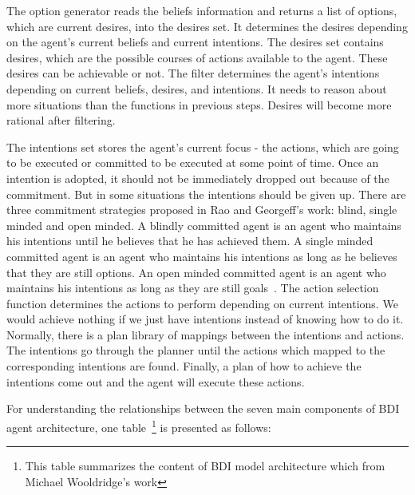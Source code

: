 The option generator reads the beliefs information and returns a list of options, which are current desires, into the desires set.
It determines the desires depending on the agent's current beliefs and current intentions.
The desires set contains desires, which are the possible courses of actions available to the agent.
These desires can be achievable or not.
The filter determines the agent's intentions depending on current beliefs, desires, and intentions.
It needs to reason about more situations than the functions in previous steps.
Desires will become more rational after filtering.

The intentions set stores the agent's current focus - the actions, which are going to be executed or committed to be executed at some point of time.
Once an intention is adopted, it should not be immediately dropped out because of the commitment.
But in some situations the intentions should be given up.
There are three commitment strategies proposed in Rao and Georgeff's work: blind, single minded and open minded.
A blindly committed agent is an agent who maintains his intentions until he believes that he has achieved them.
A single minded committed agent is an agent who maintains his intentions as long as he believes that they are still options.
An open minded committed agent is an agent who maintains his intentions as long as they are still goals~\cite{Roberto_BDIATL_2005}.
The action selection function determines the actions to perform depending on current intentions.
We would achieve nothing if we just have intentions instead of knowing how to do it.
Normally, there is a plan library of mappings between the intentions and actions.
The intentions go through the planner until the actions which mapped to the corresponding intentions are found.
Finally, a plan of how to achieve the intentions come out and the agent will execute these actions.

For understanding the relationships between the seven main components of BDI agent architecture, one table~\footnote{This table summarizes the content of BDI model architecture which from Michael Wooldridge's work\cite{Gerhard_MultiSystem_1999}} is presented as follows:

